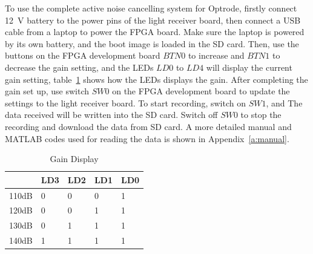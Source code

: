 To use the complete active noise cancelling system for Optrode, firstly connect \qty{12}{V} battery to the power pins of the light receiver board, then connect a USB cable from a laptop to power the FPGA board.  Make sure the laptop is powered by its own battery, and the boot image is loaded in the SD card.  Then, use the buttons on the FPGA development board $BTN0$ to increase and $BTN1$ to decrease the gain setting, and the LEDs $LD0$ to $LD4$ will display the current gain setting, table~\ref{tab_GainDisplay} shows how the LEDs displays the gain.  After completing the gain set up, use switch $SW0$ on the FPGA development board to update the settings to the light receiver board.  To start recording, switch on $SW1$, and The data received will be written into the SD card.  Switch off $SW0$ to stop the recording and download the data from SD card.  A more detailed manual and MATLAB codes used for reading the data is shown in Appendix~\ref{a:manual}.

\begin{table}[h]
\centering
\begin{tabular}{|l|l|l|l|l|}
\hline
\textbf{} & \multicolumn{1}{c|}{LD3} & \multicolumn{1}{c|}{LD2} & \multicolumn{1}{c|}{LD1} & \multicolumn{1}{c|}{LD0} \\ \hline
110dB & 0 & 0 & 0 & 1 \\ \hline
120dB & 0 & 0 & 1 & 1 \\ \hline
130dB & 0 & 1 & 1 & 1 \\ \hline
140dB & 1 & 1 & 1 & 1 \\ \hline
\end{tabular}
\caption{Gain Display}
\label{tab_GainDisplay}
\end{table}
